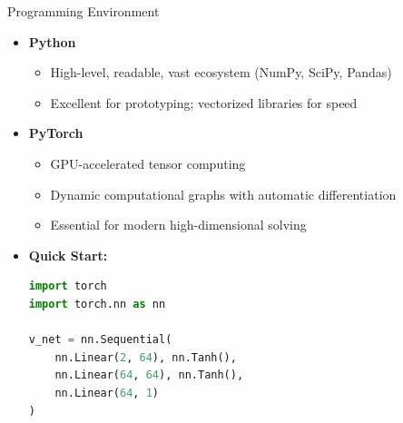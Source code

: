 \begin{frame}[fragile]{Programming Environment}
\begin{itemize}
\item \textbf{Python}
\begin{itemize}
    \item High-level, readable, vast ecosystem (NumPy, SciPy, Pandas)
    \item Excellent for prototyping; vectorized libraries for speed
\end{itemize}

\medskip
\item \textbf{PyTorch}
\begin{itemize}
    \item GPU-accelerated tensor computing
    \item Dynamic computational graphs with automatic differentiation
    \item Essential for modern high-dimensional solving
\end{itemize}

\medskip
\item \textbf{Quick Start:}
\begin{lstlisting}[language=Python]
import torch
import torch.nn as nn

v_net = nn.Sequential(
    nn.Linear(2, 64), nn.Tanh(),
    nn.Linear(64, 64), nn.Tanh(),
    nn.Linear(64, 1)
)
\end{lstlisting}
\end{itemize}
\end{frame}

